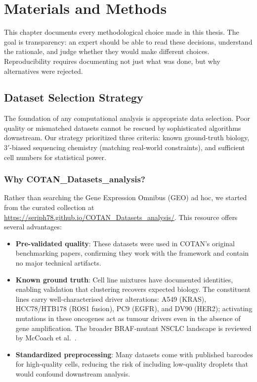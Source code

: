 \chapter{Materials and Methods}

This chapter documents every methodological choice made in this thesis. The goal is transparency: an expert should be able to read these decisions, understand the rationale, and judge whether they would make different choices. Reproducibility requires documenting not just what was done, but why alternatives were rejected.

\section{Dataset Selection Strategy}

The foundation of any computational analysis is appropriate data selection. Poor quality or mismatched datasets cannot be rescued by sophisticated algorithms downstream. Our strategy prioritized three criteria: known ground-truth biology, $3'$-biased sequencing chemistry (matching real-world constraints), and sufficient cell numbers for statistical power.

\subsection*{Why COTAN\_Datasets\_analysis?}

Rather than searching the Gene Expression Omnibus (GEO) ad hoc, we started from the curated collection at \url{https://seriph78.github.io/COTAN_Datasets_analysis/}. This resource offers several advantages:

\begin{itemize}
    \item \textbf{Pre-validated quality}: These datasets were used in COTAN's original benchmarking papers, confirming they work with the framework and contain no major technical artifacts.
    \item \textbf{Known ground truth}: Cell line mixtures have documented identities, enabling validation that clustering recovers expected biology. The constituent lines carry well-characterised driver alterations: A549 (KRAS\cite{meng2010kras}), HCC78/HTB178 (ROS1 fusion\cite{davies2012identifying}), PC9 (EGFR\cite{simonetti2010detection}), and DV90 (HER2); activating mutations in these oncogenes act as tumour drivers even in the absence of gene amplification\cite{bose2013activating}. The broader BRAF-mutant NSCLC landscape is reviewed by McCoach et al.\ \cite{mccoach2020molecular}.
    \item \textbf{Standardized preprocessing}: Many datasets come with published barcodes for high-quality cells, reducing the risk of including low-quality droplets that would confound downstream analysis.
\end{itemize}


